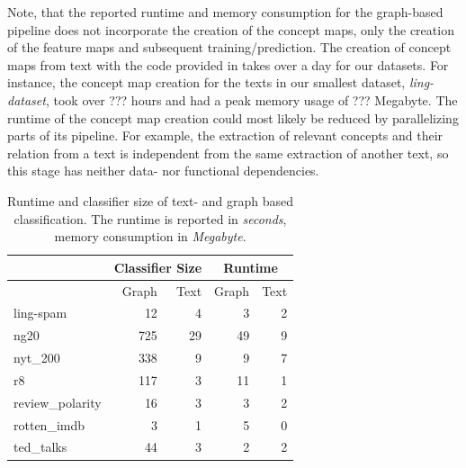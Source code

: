 Note, that the reported runtime and memory consumption for the graph-based pipeline does not incorporate the creation of the concept maps, only the creation of the feature maps and subsequent training/prediction.
The creation of concept maps from text with the code provided in \cite{Falke2017b} takes over a day for our datasets.
For instance, the concept map creation for the texts in our smallest dataset, \textit{ling-dataset}, took over ??? hours and had a peak memory usage of ??? Megabyte.
The runtime of the concept map creation could most likely be reduced by parallelizing parts of its pipeline.
For example, the extraction of relevant concepts and their relation from a text is independent from the same extraction of another text, so this stage has neither data- nor functional dependencies.


\begin{table}[htb!]
	\centering
	\begin{tabular}{lrrrr}
		& \multicolumn{2}{c}{Classifier Size} &  \multicolumn{2}{c}{Runtime} \\
		\midrule
		&  Graph &  Text & Graph &  Text \\
		\midrule
		ling-spam       & 12 & 4 & 3 & 2 \\
		ng20            & 725 & 29 & 49 & 9 \\
		nyt\_200         & 338 & 9 & 9 & 7 \\
		r8              & 117 & 3 & 11 & 1 \\
		review\_polarity & 16 & 3 & 3 & 2 \\
		rotten\_imdb     & 3 & 1 & 5 & 0 \\
		ted\_talks       & 44 & 3 & 2 & 2 \\
		\bottomrule
	\end{tabular}
\caption[Table: Runtime and Classifier size for graph- and text based classification.]{
	Runtime and classifier size of text- and graph based classification.
	The runtime is reported in \textit{seconds}, memory consumption in \textit{Megabyte}.
}
\label{table:runtime_and_classifier_size}
\end{table}


